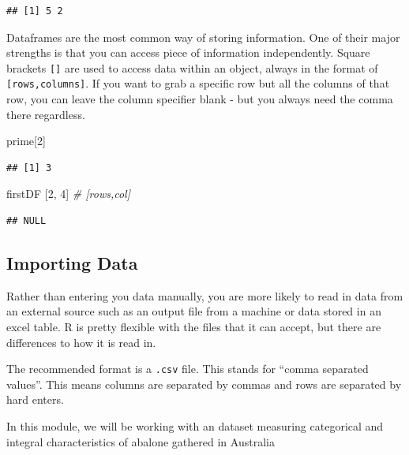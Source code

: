 \documentclass[
]{book}
\newenvironment{Shaded}{\begin{snugshade}}{\end{snugshade}}
\newcommand{\CommentTok}[1]{\textcolor[rgb]{0.56,0.35,0.01}{\textit{#1}}}
\newcommand{\DecValTok}[1]{\textcolor[rgb]{0.00,0.00,0.81}{#1}}
\newcommand{\NormalTok}[1]{#1}
\begin{document}
\begin{verbatim}
## [1] 5 2
\end{verbatim}

Dataframes are the most common way of storing information. One of their major strengths is that you can access piece of information independently. Square brackets \texttt{{[}{]}} are used to access data within an object, always in the format of \texttt{{[}rows,columns{]}}. If you want to grab a specific row but all the columns of that row, you can leave the column specifier blank - but you always need the comma there regardless.

\begin{Shaded}
\begin{Highlighting}[]
\NormalTok{prime[}\DecValTok{2}\NormalTok{]}
\end{Highlighting}
\end{Shaded}

\begin{verbatim}
## [1] 3
\end{verbatim}

\begin{Shaded}
\begin{Highlighting}[]
\NormalTok{firstDF [}\DecValTok{2}\NormalTok{, }\DecValTok{4}\NormalTok{] }\CommentTok{\# [rows,col]}
\end{Highlighting}
\end{Shaded}

\begin{verbatim}
## NULL
\end{verbatim}

\subsection{Importing Data}\label{importing-data}

Rather than entering you data manually, you are more likely to read in data from an external source such as an output file from a machine or data stored in an excel table. R is pretty flexible with the files that it can accept, but there are differences to how it is read in.

The recommended format is a \texttt{.csv} file. This stands for ``comma separated values''. This means columns are separated by commas and rows are separated by hard enters.

In this module, we will be working with an dataset measuring categorical and integral characteristics of abalone gathered in Australia
\end{document}
